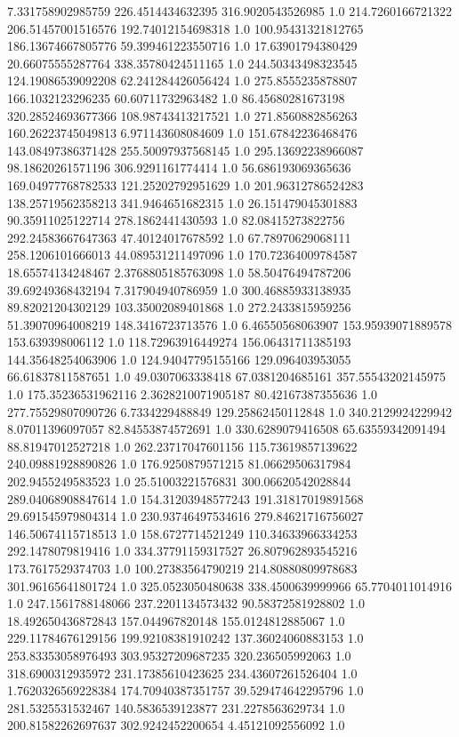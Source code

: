 7.331758902985759	226.4514434632395	316.9020543526985	1.0
214.7260166721322	206.51457001516576	192.74012154698318	1.0
100.95431321812765	186.13674667805776	59.399461223550716	1.0
17.63901794380429	20.66075555287764	338.35780424511165	1.0
244.50343498323545	124.19086539092208	62.241284426056424	1.0
275.8555235878807	166.1032123296235	60.60711732963482	1.0
86.45680281673198	320.28524693677366	108.98743413217521	1.0
271.8560882856263	160.26223745049813	6.971143608084609	1.0
151.67842236468476	143.08497386371428	255.50097937568145	1.0
295.13692238966087	98.18620261571196	306.9291161774414	1.0
56.686193069365636	169.04977768782533	121.25202792951629	1.0
201.96312786524283	138.25719562358213	341.9464651682315	1.0
26.151479045301883	90.35911025122714	278.1862441430593	1.0
82.08415273822756	292.24583667647363	47.40124017678592	1.0
67.78970629068111	258.1206101666013	44.089531211497096	1.0
170.72364009784587	18.65574134248467	2.3768805185763098	1.0
58.50476494787206	39.69249368432194	7.317904940786959	1.0
300.46885933138935	89.82021204302129	103.35002089401868	1.0
272.2433815959256	51.39070964008219	148.3416723713576	1.0
6.46550568063907	153.95939071889578	153.639398006112	1.0
118.72963916449274	156.06431711385193	144.35648254063906	1.0
124.94047795155166	129.096403953055	66.61837811587651	1.0
49.0307063338418	67.0381204685161	357.55543202145975	1.0
175.35236531962116	2.3628210071905187	80.42167387355636	1.0
277.75529807090726	6.7334229488849	129.25862450112848	1.0
340.2129924229942	8.07011396097057	82.84553874572691	1.0
330.6289079416508	65.63559342091494	88.81947012527218	1.0
262.23717047601156	115.73619857139622	240.09881928890826	1.0
176.9250879571215	81.06629506317984	202.9455249583523	1.0
25.51003221576831	300.06620542028844	289.04068908847614	1.0
154.31203948577243	191.31817019891568	29.691545979804314	1.0
230.93746497534616	279.84621716756027	146.50674115718513	1.0
158.6727714521249	110.34633966334253	292.1478079819416	1.0
334.37791159317527	26.807962893545216	173.7617529374703	1.0
100.27383564790219	214.80880809978683	301.96165641801724	1.0
325.0523050480638	338.4500639999966	65.7704011014916	1.0
247.1561788148066	237.2201134573432	90.58372581928802	1.0
18.492650436872843	157.044967820148	155.0124812885067	1.0
229.11784676129156	199.92108381910242	137.36024060883153	1.0
253.83353058976493	303.95327209687235	320.236505992063	1.0
318.6900312935972	231.17385610423625	234.43607261526404	1.0
1.7620326569228384	174.70940387351757	39.529474642295796	1.0
281.5325531532467	140.5836539123877	231.2278563629734	1.0
200.81582262697637	302.9242452200654	4.45121092556092	1.0
